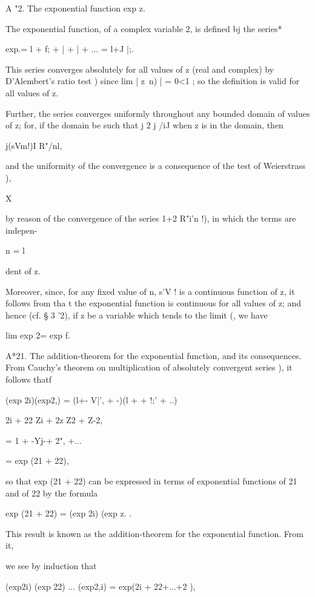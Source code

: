 %
%

A "2. The exponential function exp z.

The exponential function, of a complex variable 2, is defined bj the
series*

exp.= l + f; + | + | + ... = l+J |;.

This series converges absolutely for all values of z (real and
complex) by D'Alembert's ratio test ) since lim | z\ n) | = 0<1
; so the definition is valid for all values of z.

Further, the series converges uniformly throughout any bounded domain
of values of z; for, if the domain be such that j 2 j /iJ when z is
in the domain, then

j(sVm!)I R"/nl,

and the uniformity of the convergence is a consequence of the test of
Weierstrass ),

X

by reason of the convergence of the series 1+2 R"i'n !), in which the
terms are indepen-

n = l

dent of z.

Moreover, since, for any fixed value of n, s'V ! is a continuous
function of z, it follows from tha t the exponential function
is continuous for all values of z; and hence (cf. § 3 '2), if z be a
variable which tends to the limit (, we have

lim exp 2= exp f.

A*21. The addition-theorem for the exponential function, and its
consequences. From Cauchy's theorem on multiplication of absolutely
convergent series ), it follows thatf

(exp 2i)(exp2,) = (l+- V|', + -)(l + + !;' + ..)

2i + 22 Zi + 2z Z2 + Z-2,

= 1 + -Yj-+ 2", +...

= exp (21 + 22),

so that exp (21 + 22) can be expressed in terms of exponential
functions of 21 and of 22 by the formula

exp (21 + 22) = (exp 2i) (exp z. .

This result is known as the addition-theorem for the exponential
function. From it,

we see by induction that

(exp2i) (exp 22) ... (exp2,i) = exp(2i + 22+...+2 ),

